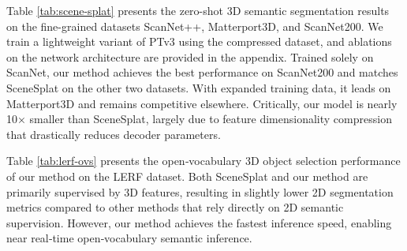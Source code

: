 \documentclass[runningheads]{llncs}
\begin{document}
Table \ref{tab:scene-splat} presents the zero-shot 3D semantic segmentation results on the fine-grained datasets ScanNet++, Matterport3D, and ScanNet200. We train a lightweight variant of PTv3\cite{wu2024ptv3,yuelitept2026} using the compressed dataset, and ablations on the network architecture are provided in the appendix.
Trained solely on ScanNet, our method achieves the best performance on ScanNet200 and matches SceneSplat on the other two datasets. With expanded training data, it leads on Matterport3D and remains competitive elsewhere. Critically, our model is nearly 10× smaller than SceneSplat, largely due to feature dimensionality compression that drastically reduces decoder parameters.

Table \ref{tab:lerf-ovs} presents the open‑vocabulary 3D object selection performance of our method on the LERF dataset. Both SceneSplat and our method are primarily supervised by 3D features, resulting in slightly lower 2D segmentation metrics compared to other methods that rely directly on 2D semantic supervision. However, our method achieves the fastest inference speed, enabling near real‑time open‑vocabulary semantic inference.
\end{document}
